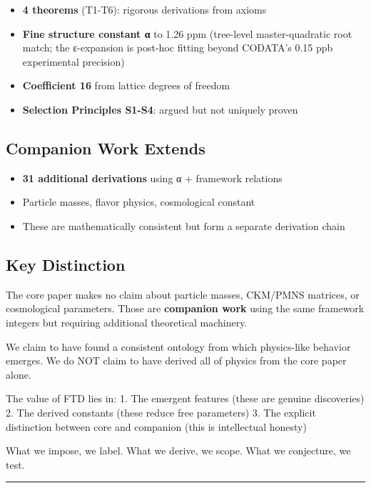 \documentclass[
  11pt,
  letterpaper,
  twoside,
  openright]{book}
\providecommand{\tightlist}{%
  \setlength{\itemsep}{0pt}\setlength{\parskip}{0pt}}
\begin{document}
\begin{itemize}
\tightlist
\item
  \textbf{4 theorems} (T1-T6): rigorous derivations from axioms
\item
  \textbf{Fine structure constant α} to 1.26 ppm (tree-level
  master-quadratic root match; the ε-expansion is post-hoc fitting
  beyond CODATA's 0.15 ppb experimental precision)
\item
  \textbf{Coefficient 16} from lattice degrees of freedom
\item
  \textbf{Selection Principles S1-S4}: argued but not uniquely proven
\end{itemize}

\subsection{Companion Work Extends}\label{companion-work-extends}

\begin{itemize}
\tightlist
\item
  \textbf{31 additional derivations} using α + framework relations
\item
  Particle masses, flavor physics, cosmological constant
\item
  These are mathematically consistent but form a separate derivation
  chain
\end{itemize}

\subsection{Key Distinction}\label{key-distinction}

The core paper makes no claim about particle masses, CKM/PMNS matrices,
or cosmological parameters. Those are \textbf{companion work} using the
same framework integers but requiring additional theoretical machinery.

We claim to have found a consistent ontology from which physics-like
behavior emerges. We do NOT claim to have derived all of physics from
the core paper alone.

The value of FTD lies in: 1. The emergent features (these are genuine
discoveries) 2. The derived constants (these reduce free parameters) 3.
The explicit distinction between core and companion (this is
intellectual honesty)

What we impose, we label. What we derive, we scope. What we conjecture,
we test.

\begin{center}\rule{0.5\linewidth}{0.5pt}\end{center}
\end{document}
